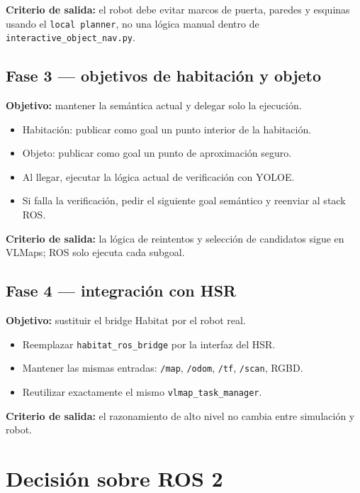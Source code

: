 \documentclass[11pt,a4paper]{article}
\begin{document}
\textbf{Criterio de salida:} el robot debe evitar marcos de puerta, paredes y
esquinas usando el \texttt{local planner}, no una lógica manual dentro de
\texttt{interactive\_object\_nav.py}.

\subsection{Fase 3 --- objetivos de habitación y objeto}

\textbf{Objetivo:} mantener la semántica actual y delegar solo la ejecución.

\begin{itemize}
  \item Habitación: publicar como goal un punto interior de la habitación.
  \item Objeto: publicar como goal un punto de aproximación seguro.
  \item Al llegar, ejecutar la lógica actual de verificación con YOLOE.
  \item Si falla la verificación, pedir el siguiente goal semántico y reenviar
        al stack ROS.
\end{itemize}

\textbf{Criterio de salida:} la lógica de reintentos y selección de candidatos
sigue en VLMaps; ROS solo ejecuta cada subgoal.

\subsection{Fase 4 --- integración con HSR}

\textbf{Objetivo:} sustituir el bridge Habitat por el robot real.

\begin{itemize}
  \item Reemplazar \texttt{habitat\_ros\_bridge} por la interfaz del HSR.
  \item Mantener las mismas entradas:
        \texttt{/map}, \texttt{/odom}, \texttt{/tf}, \texttt{/scan}, RGBD.
  \item Reutilizar exactamente el mismo \texttt{vlmap\_task\_manager}.
\end{itemize}

\textbf{Criterio de salida:} el razonamiento de alto nivel no cambia entre
simulación y robot.

\section{Decisión sobre ROS 2}
\end{document}
